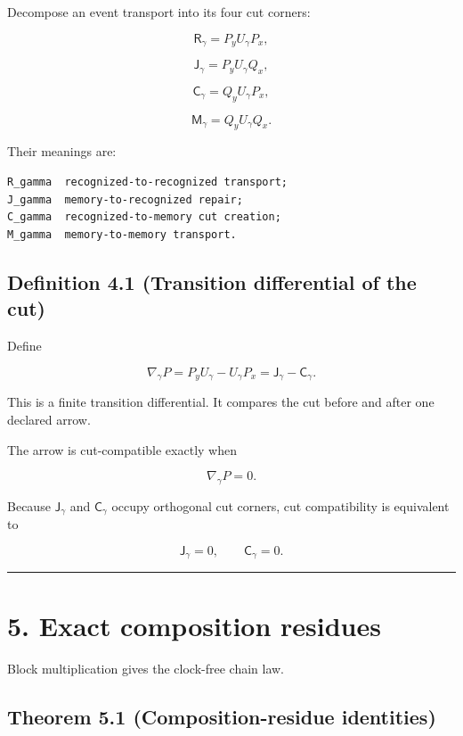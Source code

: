 Decompose an event transport into its four cut corners:

\[
\mathsf R_\gamma=P_yU_\gamma P_x,
\]

\[
\mathsf J_\gamma=P_yU_\gamma Q_x,
\]

\[
\mathsf C_\gamma=Q_yU_\gamma P_x,
\]

\[
\mathsf M_\gamma=Q_yU_\gamma Q_x.
\]

Their meanings are:

\begin{verbatim}
R_gamma  recognized-to-recognized transport;
J_gamma  memory-to-recognized repair;
C_gamma  recognized-to-memory cut creation;
M_gamma  memory-to-memory transport.
\end{verbatim}

\hypertarget{definition-4.1-transition-differential-of-the-cut}{%
\subsection{Definition 4.1 (Transition differential of the cut)}\label{definition-4.1-transition-differential-of-the-cut}}

Define

\[
\boxed{
\nabla_\gamma P
=P_yU_\gamma-U_\gamma P_x
=\mathsf J_\gamma-\mathsf C_\gamma.
}
\]

This is a finite transition differential. It compares the cut before and
after one declared arrow.

The arrow is cut-compatible exactly when

\[
\nabla_\gamma P=0.
\]

Because \(\mathsf J_\gamma\) and \(\mathsf C_\gamma\) occupy orthogonal cut
corners, cut compatibility is equivalent to

\[
\mathsf J_\gamma=0,
\qquad
\mathsf C_\gamma=0.
\]

\begin{center}\rule{0.5\linewidth}{0.5pt}\end{center}

\hypertarget{exact-composition-residues}{%
\section{5. Exact composition residues}\label{exact-composition-residues}}

Block multiplication gives the clock-free chain law.

\hypertarget{theorem-5.1-composition-residue-identities}{%
\subsection{Theorem 5.1 (Composition-residue identities)}\label{theorem-5.1-composition-residue-identities}}

